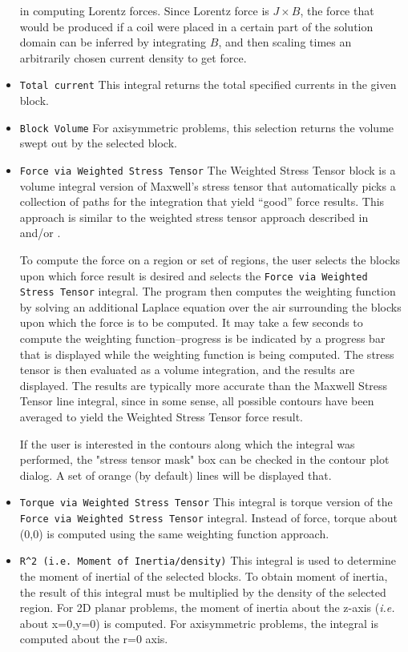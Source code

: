 \documentclass[12pt]{report}
\begin{document}
\begin{itemize}
in computing Lorentz forces.  Since Lorentz force is $J \times B$,
the force that would be produced if a coil were placed in a certain
part of the solution domain can be inferred by integrating $B$, and
then scaling times an arbitrarily chosen current density to get
force.
\item {\tt Total current}  This integral returns the total
specified currents in the given block.
\item {\tt Block Volume} For axisymmetric problems, this selection
returns the volume swept out by the selected block.
\item {\tt Force via Weighted Stress Tensor} The Weighted Stress
Tensor block is a volume integral version of Maxwell's stress
tensor that automatically picks a collection of paths for the
integration that yield ``good'' force results. This approach is
similar to the weighted stress tensor approach described in
\cite{mcfee} and/or \cite{henforce}.

To compute the force on a region or set of regions, the user
selects the blocks upon which force result is desired and selects the {\tt Force via Weighted Stress Tensor} integral.  The
program then computes the weighting function by solving an
additional Laplace equation over the air surrounding the blocks upon which the force is to be computed.
It may take a few seconds to compute the weighting
function--progress is be indicated by a progress bar that is
displayed while the weighting function is being computed. The
stress tensor is then evaluated as a volume integration, and the
results are displayed.  The results are typically more accurate
than the Maxwell Stress Tensor line integral, since in some sense,
all possible contours have been averaged to yield the Weighted
Stress Tensor force result.

If the user is interested in the contours along which the integral
was performed, the "stress tensor mask" box can be checked in the
contour plot dialog.  A set of orange (by default) lines will be
displayed that.

\item {\tt Torque via Weighted Stress Tensor}  This integral is
torque version of the {\tt Force via Weighted Stress Tensor}
integral. Instead of force, torque about (0,0) is computed using
the same weighting function approach.

\item \verb+R^2 (i.e. Moment of Inertia/density)+  This integral is
used to determine the moment of inertial of the selected blocks.  To
obtain moment of inertia, the result of this integral must be multiplied
by the density of the selected region.  For 2D planar problems, the
moment of inertia about the z-axis ({\em i.e.} about x=0,y=0) is computed.
For axisymmetric problems, the integral is computed about the r=0 axis.

\end{itemize}
\end{document}
